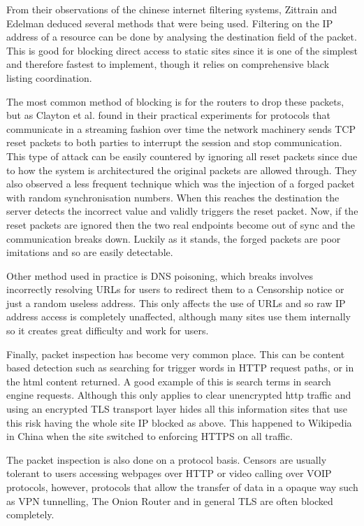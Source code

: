 \documentclass[12pt,a4paper]{article}
\begin{document}
From their observations of the chinese internet filtering systems, Zittrain and Edelman\cite{edelman2005empirical} deduced several methods that were being used. Filtering on the IP address of a resource can be done by analysing the destination field of the packet. This is good for blocking direct access to static sites since it  is one of the simplest and therefore fastest to implement, though it relies on comprehensive black listing coordination.

The most common method of blocking is for the routers to drop these packets, but as Clayton et al. found in their practical experiments\cite{clayton2006ignoring} for protocols that communicate in a streaming fashion over time the network machinery sends TCP reset packets to both parties to interrupt the session and stop communication. This type of attack can be easily countered by ignoring all reset packets since due to how the system is architectured the original packets are allowed through. They also observed a less frequent technique which was the injection of a forged packet with random synchronisation numbers. When this reaches the destination the server detects the incorrect value and validly triggers the reset packet. Now, if the reset packets are ignored then the two real endpoints become out of sync and the communication breaks down. Luckily as it stands, the forged packets are poor imitations and so are easily detectable.

Other method used in practice is DNS poisoning, which breaks involves incorrectly resolving URLs for users to redirect them to a Censorship notice or just a random useless address. This only affects the use of URLs and so raw IP address access is completely unaffected, although many sites use them internally so it creates great difficulty and work for users.

Finally, packet inspection has become very common place. This can be content based detection such as searching for trigger words in HTTP request paths, or in the html content returned. A good example of this is search terms in search engine requests. Although this only applies to clear unencrypted http traffic and using an encrypted  TLS transport layer hides all this information sites that use this risk having the whole site IP blocked as above. This happened to Wikipedia in China when the site switched to enforcing HTTPS on all traffic.

The packet inspection is also done on a protocol basis. Censors are usually tolerant to users accessing webpages over HTTP or video calling over VOIP protocols, however, protocols that allow the transfer of data in a opaque way such as VPN tunnelling, The Onion Router and in general TLS are often blocked completely.
\end{document}

